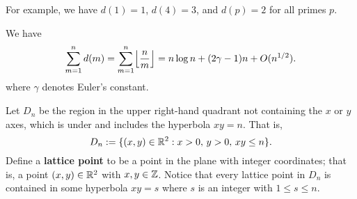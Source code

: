 For example, we have $d(1) = 1$, $d(4) = 3$, and $d(p) = 2$ for all primes $p$. 

\begin{thm}
We have 
\[ \sum_{m=1}^n d(m) = \sum_{m=1}^n \floor*{\frac nm} = n\log n + (2\gamma - 1)n + O(n^{1/2}). \]
where $\gamma$ denotes Euler's constant. 
\end{thm}
\begin{pf}
Let $D_n$ be the region in the upper right-hand quadrant not containing the $x$ or $y$ axes, 
which is under and includes the hyperbola $xy = n$. That is, 
\[ D_n := \{(x, y) \in \mathbb{R}^2 : x > 0,\, y > 0,\, xy \leq n\}. \]
Define a {\bf lattice point} to be a point in the plane with integer coordinates; that is, a point 
$(x, y) \in \mathbb{R}^2$ with $x, y \in \mathbb{Z}$. Notice that every lattice point in $D_n$ is contained in 
some hyperbola $xy = s$ where $s$ is an integer with $1 \leq s \leq n$. 


\end{pf}
